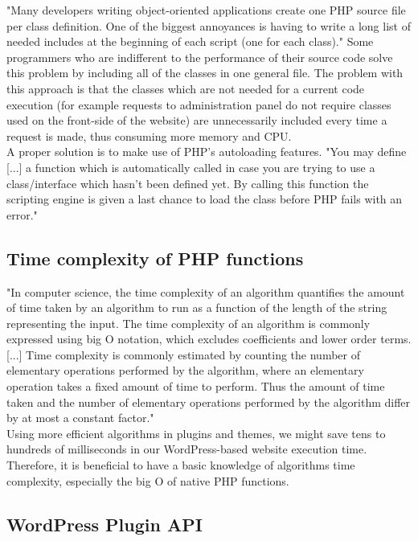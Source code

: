 "Many developers writing object-oriented applications create one PHP source file per class definition. One of the biggest annoyances is having to write a long list of needed includes at the beginning of each script (one for each class)." \cite{PHP:Autoloading} Some programmers who are indifferent to the performance of their source code solve this problem by including all of the classes in one general file. The problem with this approach is that the classes which are not needed for a current code execution (for example requests to administration panel do not require classes used on the front-side of the website) are unnecessarily included every time a request is made, thus consuming more memory and CPU. \\

A proper solution is to make use of PHP's autoloading features. "You may define [...] a function which is automatically called in case you are trying to use a class/interface which hasn't been defined yet. By calling this function the scripting engine is given a last chance to load the class before PHP fails with an error." \cite{PHP:Autoloading}

\subsection{Time complexity of PHP functions}

"In computer science, the time complexity of an algorithm quantifies the amount of time taken by an algorithm to run as a function of the length of the string representing the input. The time complexity of an algorithm is commonly expressed using big O notation, which excludes coefficients and lower order terms. [...] Time complexity is commonly estimated by counting the number of elementary operations performed by the algorithm, where an elementary operation takes a fixed amount of time to perform. Thus the amount of time taken and the number of elementary operations performed by the algorithm differ by at most a constant factor." \cite{Wiki:Time-complexity} \\

Using more efficient algorithms in plugins and themes, we might save tens to hundreds of milliseconds in our WordPress-based website execution time. Therefore, it is beneficial to have a basic knowledge of algorithms time complexity, especially the big O of native PHP functions. \cite{SO:PHP-functions-big-O}

\subsection{WordPress Plugin API}

